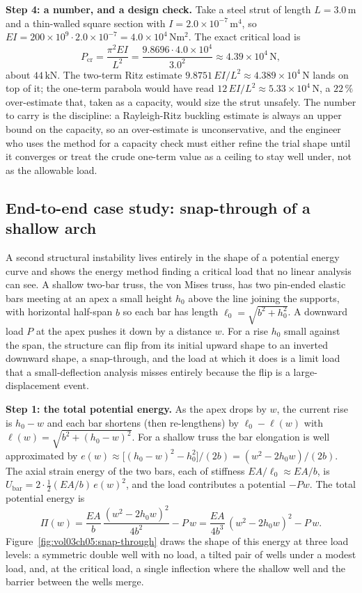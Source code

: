 \textbf{Step 4: a number, and a design check.} Take a steel strut of length
$L = 3.0\,\si{\meter}$ and a thin-walled square section with $I = 2.0\times
10^{-7}\,\si{\meter\tothe{4}}$, so $EI = 200\times 10^{9}\cdot 2.0\times
10^{-7} = 4.0\times 10^{4}\,\si{\newton\meter\squared}$. The exact critical
load is
\[
P_\text{cr} = \frac{\pi^2 EI}{L^2}
= \frac{9.8696\cdot 4.0\times 10^{4}}{3.0^2}
\approx 4.39\times 10^{4}\,\si{\newton},
\]
about $44\,\si{\kilo\newton}$. The two-term Ritz estimate
$9.8751\,EI/L^2 \approx 4.389\times 10^{4}\,\si{\newton}$ lands on top of it;
the one-term parabola would have read $12\,EI/L^2 \approx 5.33\times
10^{4}\,\si{\newton}$, a $22\,\%$ over-estimate that, taken as a capacity,
would size the strut unsafely. The number to carry is the discipline: a
Rayleigh-Ritz buckling estimate is always an upper bound on the capacity, so
an over-estimate is unconservative, and the engineer who uses the method for
a capacity check must either refine the trial shape until it converges or
treat the crude one-term value as a ceiling to stay well under, not as the
allowable load.

\subsection{End-to-end case study: snap-through of a shallow arch}

A second structural instability lives entirely in the shape of a potential
energy curve and shows the energy method finding a critical load that no
linear analysis can see. A shallow two-bar truss, the von Mises truss, has
two pin-ended elastic bars meeting at an apex a small height $h_0$ above the
line joining the supports, with horizontal half-span $b$ so each bar has
length $\ell_0 = \sqrt{b^2 + h_0^2}$. A downward load $P$ at the apex pushes
it down by a distance $w$. For a rise $h_0$ small against the span, the
structure can flip from its initial upward shape to an inverted downward
shape, a snap-through, and the load at which it does is a limit load that a
small-deflection analysis misses entirely because the flip is a large-
displacement event.

\textbf{Step 1: the total potential energy.} As the apex drops by $w$, the
current rise is $h_0 - w$ and each bar shortens (then re-lengthens) by
$\ell_0 - \ell(w)$ with $\ell(w) = \sqrt{b^2 + (h_0 - w)^2}$. For a shallow
truss the bar elongation is well approximated by $e(w) \approx
\bigl[(h_0 - w)^2 - h_0^2\bigr]/(2b) = (w^2 - 2h_0 w)/(2b)$. The axial strain
energy of the two bars, each of stiffness $EA/\ell_0 \approx EA/b$, is
$U_\text{bar} = 2\cdot\tfrac12 (EA/b)\,e(w)^2$, and the load contributes a
potential $-Pw$. The total potential energy is
\[
\Pi(w) = \frac{EA}{b}\,\frac{(w^2 - 2h_0 w)^2}{4b^2} - P\,w
= \frac{EA}{4b^3}\,(w^2 - 2h_0 w)^2 - P\,w.
\]
Figure~\ref{fig:vol03ch05:snap-through} draws the shape of this energy at
three load levels: a symmetric double well with no load, a tilted pair of
wells under a modest load, and, at the critical load, a single inflection
where the shallow well and the barrier between the wells merge.

